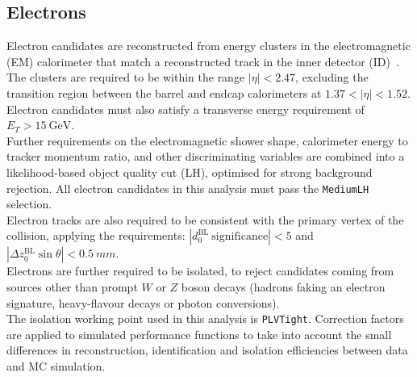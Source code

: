 \subsection{Electrons}
\label{sec:object:el}
Electron candidates are reconstructed from energy clusters in the
electromagnetic (EM) calorimeter that match a reconstructed track in
the inner detector (ID)~\cite{ATL-PHYS-PUB-2015-041,ATL-PHYS-PUB-2016-015,ATLAS-CONF-2016-024,PERF-2017-01}.
The clusters are required to be within the range $|\eta| < 2.47$,
excluding the transition region between the barrel and endcap calorimeters at 
$1.37 < |\eta| < 1.52$. 
Electron candidates must also satisfy a
transverse energy requirement of $E_{T} >\SI{15}{\GeV}$. \\
Further requirements on the electromagnetic shower shape, calorimeter
energy to tracker momentum ratio, and other discriminating variables
are combined into a likelihood-based object quality cut (LH), optimised for
strong background rejection. All electron candidates in this analysis
must pass the \texttt{MediumLH} selection.\\
Electron tracks are also required to be consistent with the primary vertex of the 
collision, applying the requirements: 
$|d_0^\mathrm{BL}~\mathrm{significance} | < 5$ and 
$|\Delta z_0^\mathrm{BL} \sin\theta| < \SI{0.5}{mm}$. \\
Electrons are further required to be isolated, to reject
candidates coming from sources other than prompt $W$ or
$Z$ boson decays (hadrons faking an electron signature,
heavy-flavour decays or photon conversions). \\
The isolation working point used in this analysis is \texttt{PLVTight}. 
Correction factors are applied to simulated performance functions to take into account the small differences in
reconstruction, identification and isolation efficiencies between data and MC simulation.

\FloatBarrier
